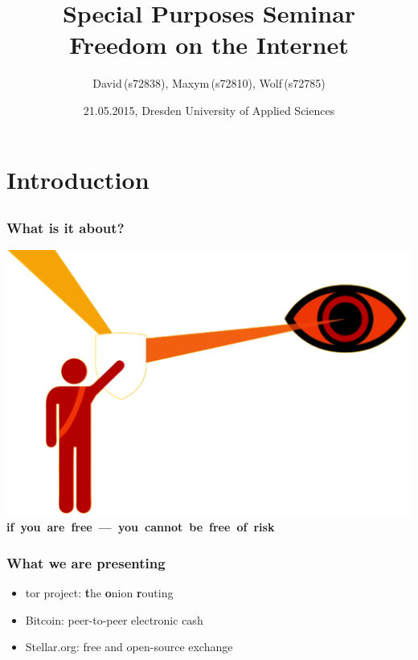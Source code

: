 \documentclass[12pt,english]{beamer}
\title{Special Purposes Seminar \\ \textbf{Freedom on the Internet} }
\author{\small David\,(s72838), Maxym\,(s72810), Wolf\,(s72785)  }
\date{21.05.2015, Dresden University of Applied Sciences }
\begin{document}
\maketitle

\section{Introduction}
\subsection{}

\begin{frame}
	\frametitle{What is it about?}
		\begin{center}
			\includegraphics[height=0.5\textheight]{./img/logo-transp.png} \\
			\mbox{\textbf{if you are free --- you cannot be free of risk}}
		\end{center}
\end{frame}

\begin{frame}
	\frametitle{What we are presenting}
	\begin{itemize}
		\item tor project: \textbf{t}he \textbf{o}nion \textbf{r}outing
		\item Bitcoin: peer-to-peer electronic cash
		\item Stellar.org: free and open-source exchange
	\end{itemize}
\end{frame}

\end{document}
